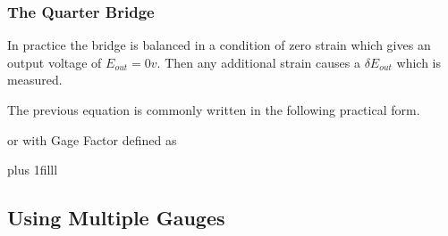 \documentclass[fleqn]{beamer} %
\newcommand{\sectionIIsubsectionItitle}{The Quarter Bridge}
\newcommand{\sectionIIsubsectionIItitle}{Using Multiple Gauges}
\newcommand{\btVFill}{\vskip0pt plus 1filll}
\begin{document}
			  \begin{frame}[label=sectionIIsubsectionI]
				\frametitle{\sectionIIsubsectionItitle} \scriptsize

				In practice the bridge is balanced in a condition of zero strain which gives an output voltage of $E_{out}=0v$. Then any additional strain causes a $\delta E_{out}$ which is measured. \vspc

The previous equation is commonly written in the following practical form. \vspcc

 \hspc or \hspc {} \vspcc
with Gage Factor defined as \hspc {}


				\btVFill

			
					
			\end{frame}	



		\subsection{\sectionIIsubsectionIItitle}\label{sectionIIsubsectionII}
\end{document}
